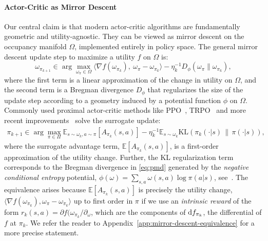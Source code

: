 \documentclass{article}
\theoremstyle{plain}
\theoremstyle{definition}
\theoremstyle{remark}
\begin{document}
\paragraph{Actor-Critic as Mirror Descent}
Our central claim is that modern actor-critic algorithms are fundamentally geometric and utility-agnostic. They can be viewed as mirror descent on the occupancy manifold $\Omega$, implemented entirely in policy space. 
The general mirror descent update step to maximize a utility $f$ on $\Omega$ is:
\begin{equation}\label{eq:pmd}
\omega_{\pi_{k+1}} \in \arg\max_{\omega_\pi \in \Omega} \langle \nabla f(\omega_{\pi_k}),\ \omega_{\pi}-\omega_{\pi_k} \rangle - \eta_k^{-1} D_\phi(\omega_\pi\|\omega_{\pi_k}),
\end{equation}
where the first term is a linear approximation of the change in utility on $\Omega$, and the second term is a Bregman divergence $D_\phi$ that regularizes the size of the update step according to a geometry induced by a potential function $\phi$ on $\Omega$.
Commonly used proximal actor-critic methods like PPO~\citep{schulman2017proximalpolicyoptimizationalgorithms}, TRPO~\citep{schulman2017trust} and more recent improvements~\citep{peng2019advantageweightedregressionsimplescalable, abdolmaleki2018maximum, haarnoja2024learning} solve the surrogate update:
\begin{align}\label{eq:MDPO}
\pi_{k+1} \in \arg \max_{\pi \in \Pi} \mathbb{E}_{s\sim\omega_k, a\sim\pi}[A_{\pi_k}(s,a)] - \eta_k^{-1} \mathbb{E}_{s\sim\omega_k} \mathrm{KL}(\pi_k(\cdot|s)\,\|\,\pi(\cdot|s)),
\end{align}
where the surrogate advantage term, $\mathbb{E}[A_{\pi_k}(s,a)]$, is a first-order approximation of the utility change. Further, the KL regularization term corresponds to the Bregman divergence in \eqref{eq:pmd} generated by the \emph{negative conditional entropy} potential, $\phi(\omega) = \sum_{s,a}\omega(s,a)\log\pi(a|s)$, see~\citep{neu2017unified}.
The equivalence arises because $\mathbb{E}[A_{\pi_k}(s,a)]$ is precisely the utility change, $\langle \nabla f(\omega_{\pi_k}), \omega_{\pi}-\omega_{\pi_k} \rangle$ up to first order in $\pi$ 
if we use an \emph{intrinsic reward} of the form $r_k(s,a) = \partial f(\omega_{\pi_k}/\partial_\omega$, which are the components of $\textup{d}f_{\pi_k}$, the differential of $f$ at $\pi_k$. We refer the reader to Appendix~\ref{app:mirror-descent-equivalence} for a more precise statement.
\end{document}
